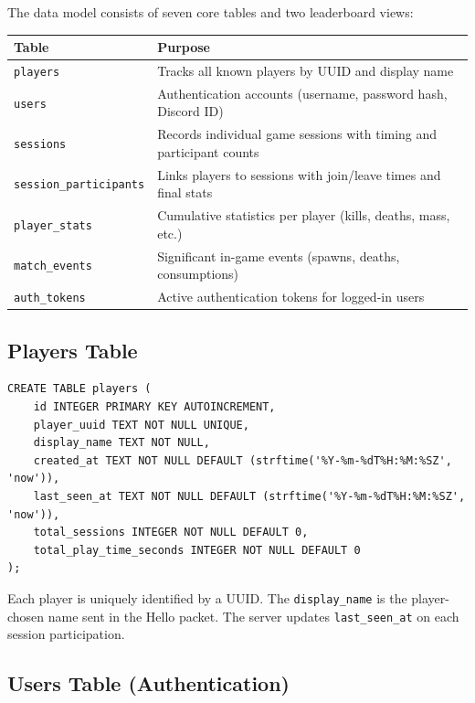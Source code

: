 \documentclass[11pt]{article}
\begin{document}
The data model consists of seven core tables and two leaderboard views:

\begin{longtable}{|>{\raggedright\arraybackslash}p{}|>{\raggedright\arraybackslash}p{}|}
\hline
\textbf{Table} & \textbf{Purpose} \\
\hline
\texttt{players} & Tracks all known players by UUID and display name \\
\hline
\texttt{users} & Authentication accounts (username, password hash, Discord ID) \\
\hline
\texttt{sessions} & Records individual game sessions with timing and participant counts \\
\hline
\texttt{session\_participants} & Links players to sessions with join/leave times and final stats \\
\hline
\texttt{player\_stats} & Cumulative statistics per player (kills, deaths, mass, etc.) \\
\hline
\texttt{match\_events} & Significant in-game events (spawns, deaths, consumptions) \\
\hline
\texttt{auth\_tokens} & Active authentication tokens for logged-in users \\
\hline
\end{longtable}

\subsection{Players Table}

\begin{verbatim}
CREATE TABLE players (
    id INTEGER PRIMARY KEY AUTOINCREMENT,
    player_uuid TEXT NOT NULL UNIQUE,
    display_name TEXT NOT NULL,
    created_at TEXT NOT NULL DEFAULT (strftime('%Y-%m-%dT%H:%M:%SZ', 'now')),
    last_seen_at TEXT NOT NULL DEFAULT (strftime('%Y-%m-%dT%H:%M:%SZ', 'now')),
    total_sessions INTEGER NOT NULL DEFAULT 0,
    total_play_time_seconds INTEGER NOT NULL DEFAULT 0
);
\end{verbatim}

Each player is uniquely identified by a UUID. The \texttt{display\_name} is the player-chosen name sent in the Hello packet. The server updates \texttt{last\_seen\_at} on each session participation.

\subsection{Users Table (Authentication)}
\end{document}
